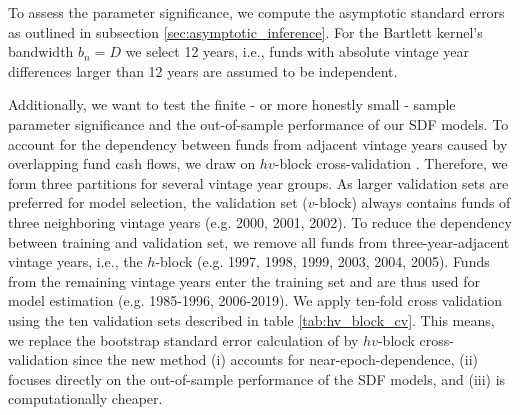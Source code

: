 \documentclass[12pt]{article}
\begin{document}
To assess the parameter significance, we compute the asymptotic standard errors as outlined in subsection \ref{sec:asymptotic_inference}.
For the Bartlett kernel's bandwidth $b_n=D$ we select 12 years, i.e., funds with absolute vintage year differences larger than 12 years are assumed to be independent.

Additionally, we want to test the finite - or more honestly small - sample parameter significance and the out-of-sample performance of our SDF models.
To account for the dependency between funds from adjacent vintage years caused by overlapping fund cash flows, we draw on $hv$-block cross-validation \citep{R00}.
Therefore, we form three partitions for several vintage year groups.
As larger validation sets are preferred for model selection, the validation set ($v$-block) always contains funds of three neighboring vintage years (e.g. 2000, 2001, 2002).
To reduce the dependency between training and validation set, we remove all funds from three-year-adjacent vintage years, i.e., the $h$-block (e.g. 1997, 1998, 1999, 2003, 2004, 2005).
Funds from the remaining vintage years enter the training set and are thus used for model estimation (e.g. 1985-1996, 2006-2019).
We apply ten-fold cross validation using the ten validation sets described in table \ref{tab:hv_block_cv}.
This means, we replace the bootstrap standard error calculation of \cite{DLP12} by $hv$-block cross-validation since the new method (i) accounts for near-epoch-dependence, (ii) focuses directly on the out-of-sample performance of the SDF models, and (iii) is computationally cheaper.
\end{document}
